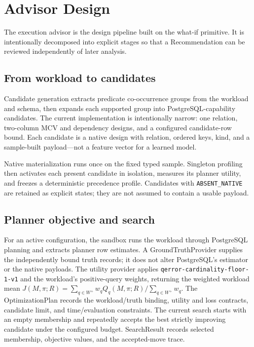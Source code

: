 \section{Advisor Design}

The execution advisor is the design pipeline built on the what-if primitive.
It is intentionally decomposed into explicit stages so that a Recommendation
can be reviewed independently of later analysis.

\subsection{From workload to candidates}

Candidate generation extracts predicate co-occurrence groups from the workload
and schema, then expands each supported group into PostgreSQL-capability
candidates. The current implementation is intentionally narrow: one relation,
two-column MCV and dependency designs, and a configured candidate-row bound.
Each candidate is a native design with relation, ordered keys, kind, and a
sample-built payload---not a feature vector for a learned model.

Native materialization runs once on the fixed typed sample. Singleton profiling
then activates each present candidate in isolation, measures its planner
utility, and freezes a deterministic precedence profile. Candidates with
\texttt{ABSENT\_NATIVE} are retained as explicit states; they are not assumed
to contain a usable payload.

\subsection{Planner objective and search}

For an active configuration, the sandbox runs the workload through PostgreSQL
planning and extracts planner row estimates. A GroundTruthProvider supplies the
independently bound truth records; it does not alter PostgreSQL's estimator or
the native payloads. The utility provider applies
\texttt{qerror-cardinality-floor-1-v1} and the workload's positive-query
weights, returning the weighted workload mean
\(J(M,\pi;R)=\sum_{q\in W^+} w_qQ_q(M,\pi;R)/\sum_{q\in W^+}w_q\). The OptimizationPlan records the
workload/truth binding, utility and loss contracts, candidate limit, and
time/evaluation constraints. The current search starts with an empty
membership and repeatedly accepts the best strictly improving candidate under
the configured budget. SearchResult records selected membership, objective
values, and the accepted-move trace.

